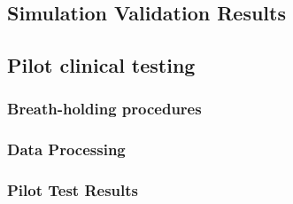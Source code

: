     \subsection{Simulation Validation Results}
    \subsection{Pilot clinical testing}
        \subsubsection{Breath-holding procedures}
        \subsubsection{Data Processing}
        \subsubsection{Pilot Test Results}



